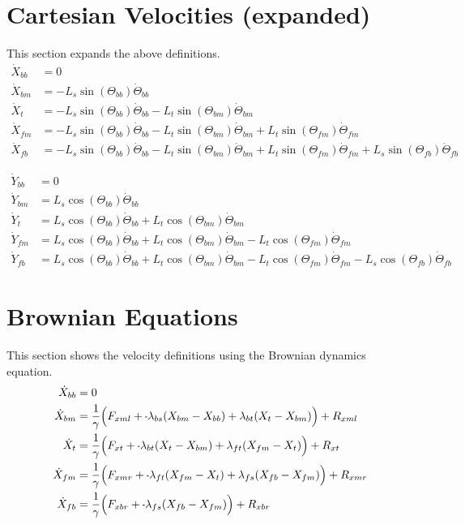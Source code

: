 \documentclass[11pt, landscape]{article}
\newcommand{\mn}{\scalebox{0.7}[1.0]{-}}
\begin{document}
\section{Cartesian Velocities (expanded)}
This section expands the above definitions. \\
\begin{align}
  \dot{X}_{bb} &= 0 \\
  \dot{X}_{bm} &= - L_{s}\sin(\Theta_{bb})\dot{\Theta}_{bb} \\
  \dot{X}_{t } &= - L_{s}\sin(\Theta_{bb})\dot{\Theta}_{bb} - L_{t}\sin(\Theta_{bm})\dot{\Theta}_{bm} \\
  \dot{X}_{fm} &= - L_{s}\sin(\Theta_{bb})\dot{\Theta}_{bb} - L_{t}\sin(\Theta_{bm})\dot{\Theta}_{bm} + L_{t}\sin(\Theta_{fm})\dot{\Theta}_{fm} \\
  \dot{X}_{fb} &= - L_{s}\sin(\Theta_{bb})\dot{\Theta}_{bb} - L_{t}\sin(\Theta_{bm})\dot{\Theta}_{bm} + L_{t}\sin(\Theta_{fm})\dot{\Theta}_{fm} + L_{s}\sin(\Theta_{fb})\dot{\Theta}_{fb}
\end{align}             
             
\begin{align}                                                                               
  \dot{Y}_{bb} &= 0 \\                                                               
  \dot{Y}_{bm} &= L_{s}\cos(\Theta_{bb})\dot{\Theta}_{bb} \\
  \dot{Y}_{t}  &= L_{s}\cos(\Theta_{bb})\dot{\Theta}_{bb} + L_{t}\cos(\Theta_{bm})\dot{\Theta}_{bm} \\
  \dot{Y}_{fm} &= L_{s}\cos(\Theta_{bb})\dot{\Theta}_{bb} + L_{t}\cos(\Theta_{bm})\dot{\Theta}_{bm} - L_{t}\cos(\Theta_{fm})\dot{\Theta}_{fm} \\
  \dot{Y}_{fb} &= L_{s}\cos(\Theta_{bb})\dot{\Theta}_{bb} + L_{t}\cos(\Theta_{bm})\dot{\Theta}_{bm} - L_{t}\cos(\Theta_{fm})\dot{\Theta}_{fm} - L_{s}\cos(\Theta_{fb})\dot{\Theta}_{fb}
\end{align}


\section{Brownian Equations}
This section shows the velocity definitions using the Brownian dynamics equation. \\
\begin{align}  
  \dot{X}_{bb} &= 0 \\
  \dot{X}_{bm} &= \frac{1}{\gamma} \Big(F_{xml} + \mn \lambda_{bs}(X_{bm} - X_{bb}) + \lambda_{bt}(X_{t } - X_{bm}) \Big) + R_{xml} \\
  \dot{X}_{t } &= \frac{1}{\gamma} \Big(F_{xt } + \mn \lambda_{bt}(X_{t } - X_{bm}) + \lambda_{ft}(X_{fm} - X_{t }) \Big) + R_{xt } \\
  \dot{X}_{fm} &= \frac{1}{\gamma} \Big(F_{xmr} + \mn \lambda_{ft}(X_{fm} - X_{t }) + \lambda_{fs}(X_{fb} - X_{fm}) \Big) + R_{xmr} \\
  \dot{X}_{fb} &= \frac{1}{\gamma} \Big(F_{xbr} + \mn \lambda_{fs}(X_{fb} - X_{fm})                                 \Big) + R_{xbr}
\end{align}
\end{document}
